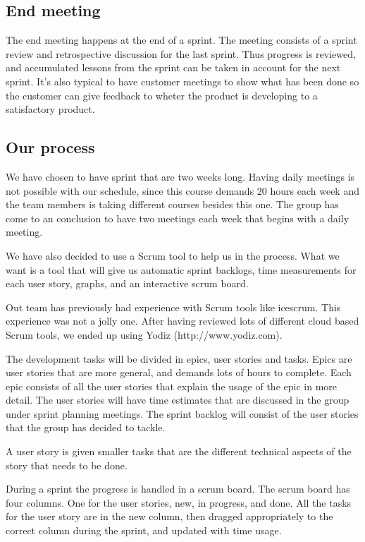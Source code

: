 \subsection{End meeting}
The end meeting happens at the end of a sprint. The meeting consists of a sprint review and retrospective discussion for the last sprint.
Thus progress is reviewed, and accumulated lessons from the sprint can be taken in account for the next sprint.
It's also typical to have customer meetings to show what has been done so the customer can give feedback to wheter the product is developing to a satisfactory product.

\subsection{Our process}
We have chosen to have sprint that are two weeks long. Having daily meetings is not possible with our schedule,
since this course demands 20 hours each week and the team members is taking different courses besides this one.
The group has come to an conclusion to have two meetings each week that begins with a daily meeting.

We have also decided to use a Scrum tool to help us in the process.
What we want is a tool that will give us automatic sprint backlogs, time measurements for each user story, graphs, and an interactive scrum board.

Out team has previously had experience with Scrum tools like icescrum. This experience was not a jolly one.
After having reviewed lots of different cloud based Scrum tools, we ended up using Yodiz (http://www.yodiz.com).

The development tasks will be divided in epics, user stories and tasks. Epics are user stories that are more general, and demands lots of hours to complete. Each epic consists
of all the user stories that explain the usage of the epic in more detail. The user stories will have time estimates that are discussed in the group under sprint planning meetings.
The sprint backlog will consist of the user stories that the group has decided to tackle.

A user story is given smaller tasks that are the different technical aspects of the story that needs to be done.

During a sprint the progress is handled in a scrum board. The scrum board has four columns. One for the user stories, new, in progress, and done.
All the tasks for the user story are in the new column, then dragged appropriately to the correct column during the sprint, and updated with time usage.
